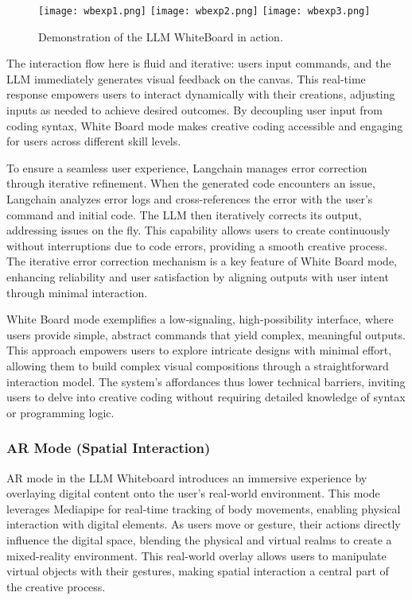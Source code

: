 \begin{figure}[h!]
    \centering
    \texttt{[image: wbexp1.png]}
    \texttt{[image: wbexp2.png]}
    \texttt{[image: wbexp3.png]}
    \caption{Demonstration of the LLM WhiteBoard in action.}
    \vspace{0.1cm}
    \label{fig:wbdemo1}
\end{figure}

The interaction flow here is fluid and iterative: users input commands, and the LLM immediately generates visual feedback on the canvas.
This real-time response empowers users to interact dynamically with their creations, adjusting inputs as needed to achieve desired outcomes.
By decoupling user input from coding syntax, White Board mode makes creative coding accessible and engaging for users across different skill levels.

To ensure a seamless user experience, Langchain manages error correction through iterative refinement.
When the generated code encounters an issue, Langchain analyzes error logs and cross-references the error with the user’s command and initial code.
The LLM then iteratively corrects its output, addressing issues on the fly.
This capability allows users to create continuously without interruptions due to code errors, providing a smooth creative process.
The iterative error correction mechanism is a key feature of White Board mode, enhancing reliability and user satisfaction by aligning outputs with user intent through minimal interaction.

White Board mode exemplifies a low-signaling, high-possibility interface, where users provide simple, abstract commands that yield complex, meaningful outputs.
This approach empowers users to explore intricate designs with minimal effort, allowing them to build complex visual compositions through a straightforward interaction model.
The system’s affordances thus lower technical barriers, inviting users to delve into creative coding without requiring detailed knowledge of syntax or programming logic.

\subsubsection{AR Mode (Spatial Interaction)}

AR mode in the LLM Whiteboard introduces an immersive experience by overlaying digital content onto the user’s real-world environment.
This mode leverages Mediapipe for real-time tracking of body movements, enabling physical interaction with digital elements.
As users move or gesture, their actions directly influence the digital space, blending the physical and virtual realms to create a mixed-reality environment.
This real-world overlay allows users to manipulate virtual objects with their gestures, making spatial interaction a central part of the creative process.

